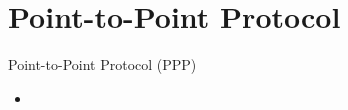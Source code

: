 \section{Point-to-Point Protocol}
    \begin{frame}{Point-to-Point Protocol (PPP)}
        \begin{itemize}
            \item 
        \end{itemize}
    \end{frame}
